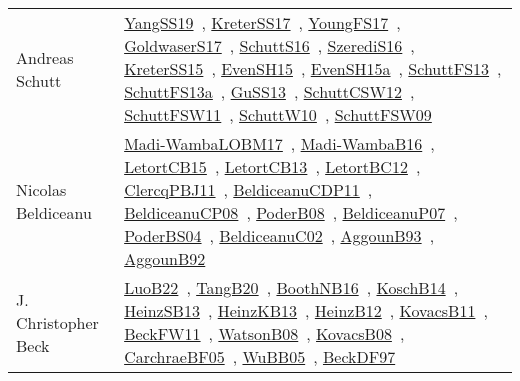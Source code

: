 {\begin{longtable}{p{4cm}p{20cm}}
Andreas Schutt & \href{works/YangSS19.pdf}{YangSS19}~\cite{YangSS19}, \href{works/KreterSS17.pdf}{KreterSS17}~\cite{KreterSS17}, \href{works/YoungFS17.pdf}{YoungFS17}~\cite{YoungFS17}, \href{works/GoldwaserS17.pdf}{GoldwaserS17}~\cite{GoldwaserS17}, \href{works/SchuttS16.pdf}{SchuttS16}~\cite{SchuttS16}, \href{works/SzerediS16.pdf}{SzerediS16}~\cite{SzerediS16}, \href{works/KreterSS15.pdf}{KreterSS15}~\cite{KreterSS15}, \href{works/EvenSH15.pdf}{EvenSH15}~\cite{EvenSH15}, \href{works/EvenSH15a.pdf}{EvenSH15a}~\cite{EvenSH15a}, \href{works/SchuttFS13.pdf}{SchuttFS13}~\cite{SchuttFS13}, \href{works/SchuttFS13a.pdf}{SchuttFS13a}~\cite{SchuttFS13a}, \href{works/GuSS13.pdf}{GuSS13}~\cite{GuSS13}, \href{works/SchuttCSW12.pdf}{SchuttCSW12}~\cite{SchuttCSW12}, \href{works/SchuttFSW11.pdf}{SchuttFSW11}~\cite{SchuttFSW11}, \href{works/SchuttW10.pdf}{SchuttW10}~\cite{SchuttW10}, \href{works/SchuttFSW09.pdf}{SchuttFSW09}~\cite{SchuttFSW09}\\
Nicolas Beldiceanu & \href{works/Madi-WambaLOBM17.pdf}{Madi-WambaLOBM17}~\cite{Madi-WambaLOBM17}, \href{works/Madi-WambaB16.pdf}{Madi-WambaB16}~\cite{Madi-WambaB16}, \href{works/LetortCB15.pdf}{LetortCB15}~\cite{LetortCB15}, \href{works/LetortCB13.pdf}{LetortCB13}~\cite{LetortCB13}, \href{works/LetortBC12.pdf}{LetortBC12}~\cite{LetortBC12}, \href{works/ClercqPBJ11.pdf}{ClercqPBJ11}~\cite{ClercqPBJ11}, \href{works/BeldiceanuCDP11.pdf}{BeldiceanuCDP11}~\cite{BeldiceanuCDP11}, \href{works/BeldiceanuCP08.pdf}{BeldiceanuCP08}~\cite{BeldiceanuCP08}, \href{works/PoderB08.pdf}{PoderB08}~\cite{PoderB08}, \href{works/BeldiceanuP07.pdf}{BeldiceanuP07}~\cite{BeldiceanuP07}, \href{works/PoderBS04.pdf}{PoderBS04}~\cite{PoderBS04}, \href{works/BeldiceanuC02.pdf}{BeldiceanuC02}~\cite{BeldiceanuC02}, \href{works/AggounB93.pdf}{AggounB93}~\cite{AggounB93}, \href{}{AggounB92}~\cite{AggounB92}\\
J. Christopher Beck & \href{works/LuoB22.pdf}{LuoB22}~\cite{LuoB22}, \href{works/TangB20.pdf}{TangB20}~\cite{TangB20}, \href{works/BoothNB16.pdf}{BoothNB16}~\cite{BoothNB16}, \href{works/KoschB14.pdf}{KoschB14}~\cite{KoschB14}, \href{works/HeinzSB13.pdf}{HeinzSB13}~\cite{HeinzSB13}, \href{works/HeinzKB13.pdf}{HeinzKB13}~\cite{HeinzKB13}, \href{works/HeinzB12.pdf}{HeinzB12}~\cite{HeinzB12}, \href{works/KovacsB11.pdf}{KovacsB11}~\cite{KovacsB11}, \href{}{BeckFW11}~\cite{BeckFW11}, \href{works/WatsonB08.pdf}{WatsonB08}~\cite{WatsonB08}, \href{works/KovacsB08.pdf}{KovacsB08}~\cite{KovacsB08}, \href{works/CarchraeBF05.pdf}{CarchraeBF05}~\cite{CarchraeBF05}, \href{works/WuBB05.pdf}{WuBB05}~\cite{WuBB05}, \href{works/BeckDF97.pdf}{BeckDF97}~\cite{BeckDF97}\\

\end{longtable}}
